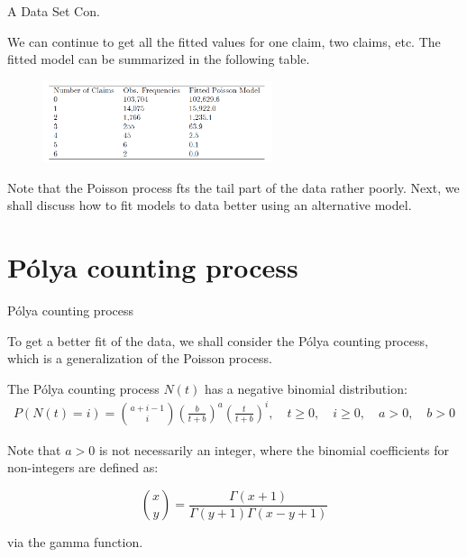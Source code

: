 \documentclass{beamer}
\begin{document}
\begin{frame}{A Data Set Con.}


    {\footnotesize \footnotesize
    \par We can continue to get all the fitted values for one claim, two claims, 
    etc. The fitted model can be summarized in the following table.
    \begin{figure}
    \centering
    \includegraphics[width=0.6\textwidth]{2025-09-08 155325}
    \end{figure}
    \par Note that the Poisson process fts the tail part of the data rather poorly.
    Next, we shall discuss how to fit models to data better using an alternative
    model.
    }
    
\end{frame}

\section{Pólya counting process}
\begin{frame}{Pólya counting process}

    {\footnotesize \footnotesize
    \par To get a better fit of the data, we shall consider the Pólya counting process,
    which is a generalization of the Poisson process.
    \vspace{1em}

    \par The Pólya counting process $N(t)$ has a negative binomial distribution:
    \begin{align*}
        P(N(t) = i) = \binom{a + i - 1}{i}
         \left( \frac{b}{t + b} \right)^a \left( \frac{t}{t + b} \right)^i, 
         \quad t \geq 0, \quad i \geq 0, \quad a > 0, \quad b > 0
    \end{align*}
    \par Note that \( a > 0 \) is not necessarily an integer, where the binomial coefficients for non-integers are defined as:

    \[
    \binom{x}{y} = \frac{\Gamma(x + 1)}{\Gamma(y + 1)\Gamma(x - y + 1)}
    \]

    \par via the gamma function.

        }
\end{frame}
\end{document}
